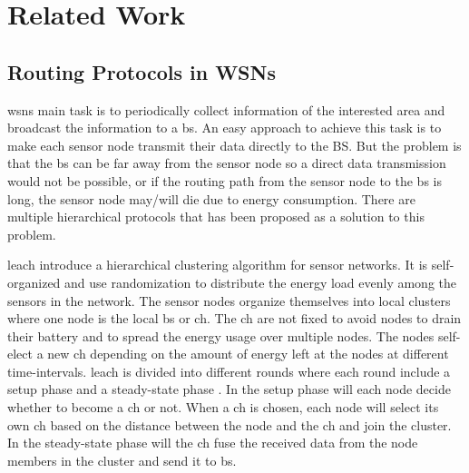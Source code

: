 \documentclass[USenglish]{uit-thesis}
\begin{document}
\chapter{Related Work}



\section{Routing Protocols in WSNs}
\Gls{wsn}s  main task is to periodically collect information of the interested area and broadcast the information to a \gls{bs}. An easy approach to achieve this task is to make each sensor node transmit their data directly to the BS. But the problem is that the \gls{bs} can be far away from the sensor node so a direct data transmission would not be possible, or if the routing path from the sensor node to the \gls{bs} is long, the sensor node may/will die due to energy consumption. There are multiple hierarchical protocols that has been proposed as a solution to this problem.


\Gls{leach} \cite{leach} introduce a hierarchical clustering algorithm for sensor networks. It is self-organized and use randomization to distribute the energy load evenly among the sensors in the network. The sensor nodes organize themselves into local clusters where one node is the local \gls{bs} or \gls{ch}. The \gls{ch} are not fixed to avoid nodes to drain their battery and to spread the energy usage over multiple nodes. The nodes self-elect a new \gls{ch} depending on the amount of energy left at the nodes at different time-intervals. \gls{leach} is divided into different rounds where each round include a setup phase and a steady-state phase \cite{tree_based}. In the setup phase will each node decide whether to become a \gls{ch} or not. When a \gls{ch} is chosen, each node will select its own \gls{ch} based on the distance between the node and the \gls{ch} and join the cluster. In the steady-state phase will the \gls{ch} fuse the received data from the node members in the cluster and send it to \gls{bs}.
\end{document}
